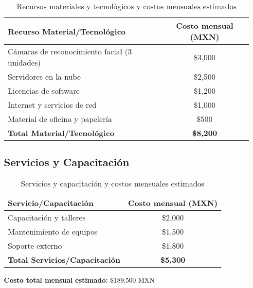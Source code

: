 \begin{table}[h!]
\centering
\footnotesize
\setlength{\tabcolsep}{3.5pt}
\renewcommand{\arraystretch}{0.98}
\begin{tabular}{|l|c|}
\hline
\textbf{Recurso Material/Tecnológico} & \textbf{Costo mensual (MXN)} \\
\hline
Cámaras de reconocimiento facial (3 unidades) & \$3,000 \\
Servidores en la nube & \$2,500 \\
Licencias de software & \$1,200 \\
Internet y servicios de red & \$1,000 \\
Material de oficina y papelería & \$500 \\
\hline
\textbf{Total Material/Tecnológico} & \textbf{\$8,200} \\
\hline
\end{tabular}
\caption{Recursos materiales y tecnológicos y costos mensuales estimados}
\end{table}

\subsection{Servicios y Capacitación}

\begin{table}[h!]
\centering
\footnotesize
\setlength{\tabcolsep}{3.5pt}
\renewcommand{\arraystretch}{0.98}
\begin{tabular}{|l|c|}
\hline
\textbf{Servicio/Capacitación} & \textbf{Costo mensual (MXN)} \\
\hline
Capacitación y talleres & \$2,000 \\
Mantenimiento de equipos & \$1,500 \\
Soporte externo & \$1,800 \\
\hline
\textbf{Total Servicios/Capacitación} & \textbf{\$5,300} \\
\hline
\end{tabular}
\caption{Servicios y capacitación y costos mensuales estimados}
\end{table}

\vspace{0.5cm}
\textbf{Costo total mensual estimado:} \$189,500 MXN